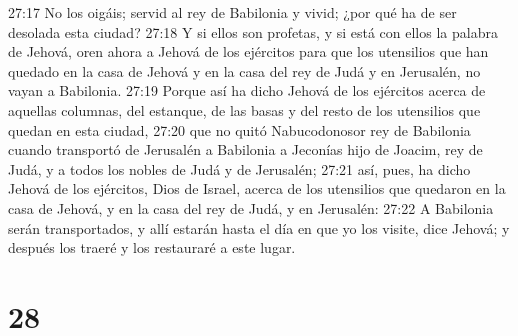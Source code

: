 27:17 No los oigáis; servid al rey de Babilonia y vivid; ¿por qué ha de ser desolada esta ciudad?  
27:18 Y si ellos son profetas, y si está con ellos la palabra de Jehová, oren ahora a Jehová de los ejércitos para que los utensilios que han quedado en la casa de Jehová y en la casa del rey de Judá y en Jerusalén, no vayan a Babilonia.  
27:19 Porque así ha dicho Jehová de los ejércitos acerca de aquellas columnas, del estanque, de las basas y del resto de los utensilios que quedan en esta ciudad,  
27:20 que no quitó Nabucodonosor rey de Babilonia cuando transportó de Jerusalén a Babilonia a Jeconías hijo de Joacim, rey de Judá, y a todos los nobles de Judá y de Jerusalén;  
27:21 así, pues, ha dicho Jehová de los ejércitos, Dios de Israel, acerca de los utensilios que quedaron en la casa de Jehová, y en la casa del rey de Judá, y en Jerusalén:  
27:22 A Babilonia serán transportados, y allí estarán hasta el día en que yo los visite, dice Jehová; y después los traeré y los restauraré a este lugar. 

\chapter{28}


